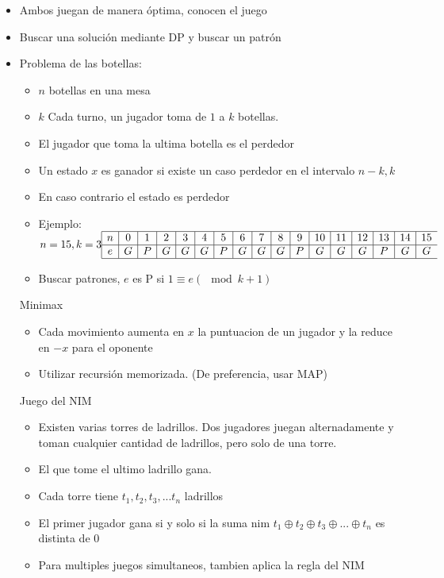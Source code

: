\documentclass[a4paper,spanish,10pt]{article}
\begin{document}
\begin{itemize}
	\item Ambos juegan de manera \'optima, conocen el juego
	\item Buscar una soluci\'on mediante DP y buscar un patr\'on
	\item Problema de las botellas:
		\begin{itemize}
			\item $n$  botellas en una mesa
			\item $k$  Cada turno, un jugador toma de $1$ a $k$ botellas.
			\item El jugador que toma la ultima botella es el perdedor
			\item Un estado $x$ es ganador si existe un caso perdedor en el intervalo $n-k,k$
			\item En caso contrario el estado es perdedor
			\item Ejemplo: $n=15,k=3
				\begin{array}{|c|c|c|c|c|c|c|c|c|c|c|c|c|c|c|c|c}
					\hline
					n&0&1&2&3&4&5&6&7&8&9&10&11&12&13&14&15\\
					\hline
					e&G&P&G&G&G&P&G&G&G&P& G& G& G& P& G&G\\
					\hline
				\end{array}
				$
			\item Buscar patrones, $e$ es P si $ 1 \equiv e (\mod k+1) $
			\end{itemize}
			Minimax
			\begin{itemize}
			\item Cada movimiento aumenta en $x$ la puntuacion de un jugador y la reduce en $-x$ para el oponente
			\item Utilizar recursi\'on memorizada. (De preferencia, usar MAP)
			\end{itemize}
			Juego del NIM
			\begin{itemize}
			\item Existen varias torres de ladrillos. Dos jugadores juegan alternadamente y toman cualquier cantidad de ladrillos, pero solo de una torre.
			\item El que tome el ultimo ladrillo gana.
			\item Cada torre tiene $t_1, t_2, t_3, ... t_n$ ladrillos
			\item El primer jugador gana si y solo si la suma nim $t_1 \oplus t_2 \oplus t_3 \oplus ... \oplus t_n$ es distinta de 0
			\item Para multiples juegos simultaneos, tambien aplica la regla del NIM
		\end{itemize}
\end{itemize}
\end{document}
